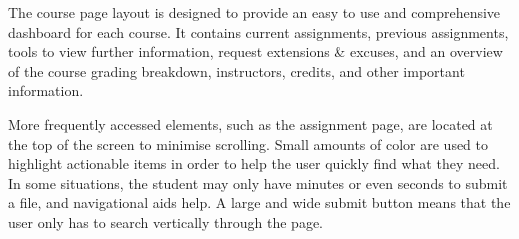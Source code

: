 The course page layout is designed to provide an easy to use and comprehensive dashboard for each course. It contains current assignments, previous assignments, tools to view further information, request extensions \& excuses, and an overview of the course grading breakdown, instructors, credits, and other important information.

More frequently accessed elements, such as the assignment page, are located at the top of the screen to minimise scrolling. Small amounts of color are used to highlight actionable items in order to help the user quickly find what they need. In some situations, the student may only have minutes or even seconds to submit a file, and navigational aids help. A large and wide submit button means that the user only has to search vertically through the page.

